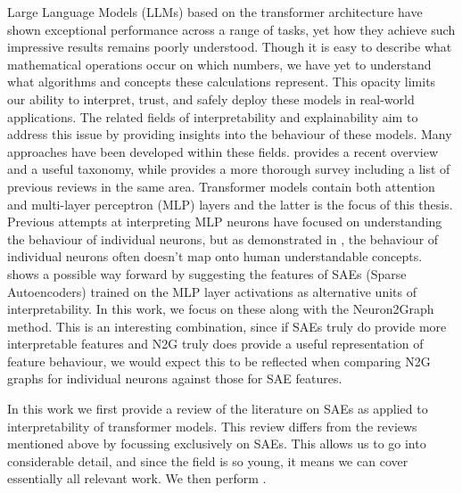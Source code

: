 

Large Language Models (LLMs) based on the transformer architecture \cite{vaswani_attention_2023} have shown exceptional performance across a range of tasks, yet how they achieve such impressive results remains poorly understood.
Though it is easy to describe what mathematical operations occur on which numbers, we have yet to understand what algorithms and concepts these calculations represent.
This opacity limits our ability to interpret, trust, and safely deploy these models in real-world applications.
The related fields of interpretability and explainability aim to address this issue by providing insights into the behaviour of these models.
Many approaches have been developed within these fields.
\cite{bereska_mechanistic_2024} provides a recent overview and a useful taxonomy, while \cite{rauker_toward_2023} provides a more thorough survey including a list of previous reviews in the same area.
Transformer models contain both attention and multi-layer perceptron (MLP) layers and the latter is the focus of this thesis.
Previous attempts at interpreting MLP neurons have focused on understanding the behaviour of individual neurons, but as demonstrated in \cite{elhage_toy_2022}, the behaviour of individual neurons often doesn't map onto human understandable concepts.
\cite{bricken_towards_2023} shows a possible way forward by suggesting the features of SAEs (Sparse Autoencoders) trained on the MLP layer activations as alternative units of interpretability.
In this work, we focus on these along with the Neuron2Graph \cite{foote_neuron_2023} method.
This is an interesting combination, since if SAEs truly do provide more interpretable features and N2G truly does provide a useful representation of feature behaviour, we would expect this to be reflected when comparing N2G graphs for individual neurons against those for SAE features. 

In this work we first provide a review of the literature on SAEs as applied to interpretability of transformer models.
This review differs from the reviews mentioned above by focussing exclusively on SAEs.
This allows us to go into considerable detail, and since the field is so young, it means we can cover essentially all relevant work.
We then perform .



